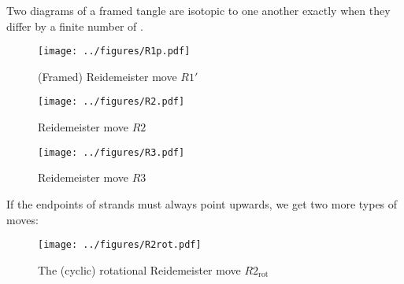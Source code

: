 \documentclass{beamer}
\begin{document}
\begin{frame}
        \begin{theorem}[Reidemeister]
                Two diagrams of a framed tangle are isotopic to one another
                exactly when they differ by a finite number of
                .
        \end{theorem}
\end{frame}

\begin{frame}
        \begin{figure}
                \centering
                \texttt{[image: ../figures/R1p.pdf]}
                \caption{(Framed) Reidemeister move $R1'$}
                \label{fig:R1p}
        \end{figure}
\end{frame}

\begin{frame}
        \begin{figure}
                \centering
                \texttt{[image: ../figures/R2.pdf]}
                \caption{Reidemeister move $R2$}
                \label{fig:R2}
        \end{figure}
\end{frame}

\begin{frame}
        \begin{figure}
                \centering
                \texttt{[image: ../figures/R3.pdf]}
                \caption{Reidemeister move $R3$}
                \label{fig:R3}
        \end{figure}
\end{frame}

\begin{frame}
        If the endpoints of strands must always point upwards, we get two more types of
        moves:
        \pause
        \begin{figure}
                \centering
                \texttt{[image: ../figures/R2rot.pdf]}
                \caption{The (cyclic) rotational Reidemeister move $R2_{\text{rot}}$}
                \label{fig:R2rot}
        \end{figure}
\end{frame}
\end{document}
